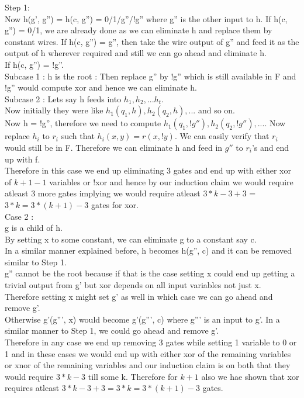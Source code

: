\documentclass[12pt]{exam}
\begin{document}
\begin{questions}
\begin{solution}
\begin{parts}
Step 1:\\
Now h(g', g'') = h(c, g'') = 0/1/g''/!g'' where g'' is the other input
to h. If h(c, g'') = 0/1, we are already done as we can eliminate h and replace them
by constant wires. If h(c, g'') = g'', then take the wire output of g'' and feed
it as the output of h wherever required and still we can go ahead and
eliminate h.\\
If h(c, g'') = !g''.\\
Subcase 1 : h is the root : Then replace g'' by !g'' which is still available in F
and !g'' would compute xor and hence we can eliminate h.\\

Subcase 2 : Lets say h feeds into $h_1, h_2, ... h_t$.\\
Now initially they were like $h_1(q_1, h), h_2(q_2, h), ...$ and so on.\\
Now h = !g'', therefore we need to compute
$h_1(q_1, !g''), h_2(q_2, !g''), ...$. Now replace $h_i$ to $r_i$
such that $h_i(x, y) = r(x, !y)$. We can easily verify that $r_i$
would still be in F. Therefore we can eliminate h and feed in $g''$
to $r_i$'s and end up with f.\\

Therefore in this case we end up eliminating 3 gates and end up with either
xor of $k+1-1$ variables or !xor and hence by our induction claim we would
require atleast 3 more gates implying we would require atleast $3*k-3+3$ = $3*k = 3*(k+1)-3$
gates for xor.\\

Case 2 :\\
g is a child of h.\\
By setting x to some constant, we can eliminate g to a constant say c.\\
In a similar manner explained before, h becomes h(g'', c) and it can be removed
similar to Step 1.\\
g'' cannot be the root because if that is the case setting x could end
up getting a trivial output from g' but xor depends on all
input variables not just x.\\
Therefore setting x might set g' as well in which case we can go ahead
and remove g'.\\
Otherwise g'(g''', x) would become g'(g''', c) where g''' is an input to g'.
In a similar manner to Step 1, we could go ahead and remove g'.\\

Therefore in any case we end up removing 3 gates while setting 1 variable
to 0 or 1 and in these cases we would end up with either xor of the remaining
variables or xnor of the remaining variables and our induction claim
is on both that they would require $3*k-3$ till some k. Therefore for $k+1$
also we hae shown that xor requires atleast $3*k-3+3 = 3*k = 3*(k+1)-3$ gates.\\


\end{parts}
\end{solution}
\end{questions}
\end{document}
